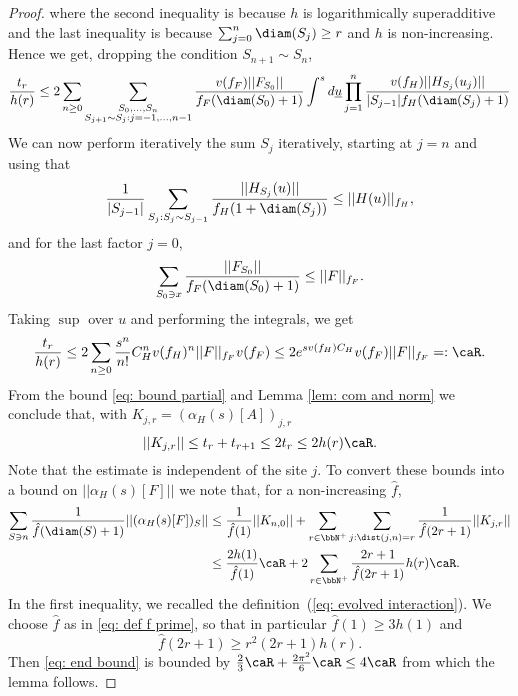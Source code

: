 \begin{proof}
	where the second inequality is because $h$ is logarithmically superadditive and the last inequality is because $\sum_{j=0}^n\diam(S_j) \geq r$ and $h$ is non-increasing.  Hence we get, dropping the condition $S_{n+1} \sim S_n$,
	\begin{equation} \label{eq: anchored sums}
		\frac{t_r}{h(r)} 
		\leq  2  \sum_{n\geq 0}  \sum_{\substack{S_0,\ldots,S_{n} \\
				S_{j+1}  \sim S_j: j=-1,\ldots, n-1}}    \frac{v(f_F) ||F_{S_0}||}{f_F(\diam(S_0)+1)}   \int^s d\underline{u}            \prod_{j=1}^n\frac{ v(f_H)|| H_{S_j}(u_j)||}{|S_{j-1}|f_H(\diam(S_{j})+1)}  
	\end{equation}
	We can now perform iteratively the sum  $S_j$ iteratively, starting at $j=n$ and using that
	$$
	\frac{1}{|S_{j-1}|}\sum_{{S_j:S_j \sim S_{j-1}}} \frac{|| H_{S_j}(u)||}{f_H(1+\diam(S_{j}))}  \leq || H(u) ||_{{f_H}},
	$$
	and for the last factor $j=0$,
	\begin{equation*}
		\sum_{S_0\ni x} \frac{||F_{S_0}||}{{{f_F}}(\diam(S_0)+1)}\leq ||F||_{{f_F}}.
	\end{equation*}
	Taking $\sup$ over $u$ and performing the integrals, we get
	\begin{equation}\label{propagation}
		\frac{t_r}{h(r)} \leq 2 \sum_{n\geq 0} \frac{s^n}{n!} C_H^n v(f_H)^n ||F||_{{f_F}} v(f_F)  \leq 
		2 e^{ s v(f_H) C_H}  v(f_F) ||F||_{{f_F}}=:\caR.
	\end{equation}
	From the bound \eqref{eq: bound partial} and  Lemma \ref{lem: com and norm} we conclude that, with $K_{j,r}=(\alpha_H(s)[A])_{j,r}$ 
	$$
	|| K_{j,r} || \leq   t_r+t_{r+1} \leq 2 t_r \leq 2 h(r) \caR.
	$$ 
	Note that the estimate is independent of the site $j$. To convert these bounds into a bound on $||\alpha_H(s)[F]||$ we note that, for a non-increasing $\hat f$,
	\begin{align}
		\sum_{S\ni n}  \frac{1}{\hat f(\diam(S)+1)} ||(\alpha_H(s)[F])_S|| &  \leq   \frac{1}{\hat f(1)}  ||K_{n,0}||   +\sum_{r\in\bbN^+} \sum_{j: \dist(j,n)= r}   \frac{1}{\hat f(2r+1)}  ||K_{j,r}||   \\
		&  \leq     \frac{2 h(1) }{\hat f(1)} \caR+ 2 \sum_{r\in\bbN^+}  \frac{2r+1}{\hat f(2r+1)} h(r)\caR.  \label{eq: end bound} 
	\end{align}
	In the first inequality, we recalled the definition~(\ref{eq: evolved interaction}). We choose $\hat f$ as in \eqref{eq: def f prime}, so that in particular  $\hat f(1) \geq   3 h(1) $ and 
	$$
	\hat f(2r+1) \geq  r^2 (2r+1)h(r). 
	$$
	Then  \eqref{eq: end bound} is bounded by $  \frac{2}{3}\caR+ \frac{2\pi^2}{6}\caR \leq 4\caR$ from which the lemma follows. 
\end{proof}


